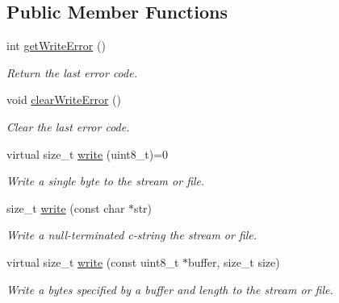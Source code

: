 \subsection*{Public Member Functions}
\begin{DoxyCompactItemize}
\item 
\mbox{\label{class_print_a88a4a829fb5d589efb43955ad0cbddcc}} 
int \mbox{\hyperlink{class_print_a88a4a829fb5d589efb43955ad0cbddcc}{get\+Write\+Error}} ()
\begin{DoxyCompactList}\small\item\em Return the last error code. \end{DoxyCompactList}\item 
\mbox{\label{class_print_aec9ecf84cc6d9087a650def3cefc459e}} 
void \mbox{\hyperlink{class_print_aec9ecf84cc6d9087a650def3cefc459e}{clear\+Write\+Error}} ()
\begin{DoxyCompactList}\small\item\em Clear the last error code. \end{DoxyCompactList}\item 
\mbox{\label{class_print_a5be30d49adae2406a270c29ba9a3e0a3}} 
virtual size\+\_\+t \mbox{\hyperlink{class_print_a5be30d49adae2406a270c29ba9a3e0a3}{write}} (uint8\+\_\+t)=0
\begin{DoxyCompactList}\small\item\em Write a single byte to the stream or file. \end{DoxyCompactList}\item 
size\+\_\+t \mbox{\hyperlink{class_print_a5b40e0e9cab1f2fe5bb0cb22ffe5adda}{write}} (const char $\ast$str)
\begin{DoxyCompactList}\small\item\em Write a null-\/terminated c-\/string the stream or file. \end{DoxyCompactList}\item 
virtual size\+\_\+t \mbox{\hyperlink{class_print_a88864e109589a5be9b0f5ba1327f8421}{write}} (const uint8\+\_\+t $\ast$buffer, size\+\_\+t size)
\begin{DoxyCompactList}\small\item\em Write a bytes specified by a buffer and length to the stream or file. \end{DoxyCompactList}\item 
\mbox{\label{class_print_acfe80773011eb17dfb52c2fba517a093}} 

\end{DoxyCompactItemize}
